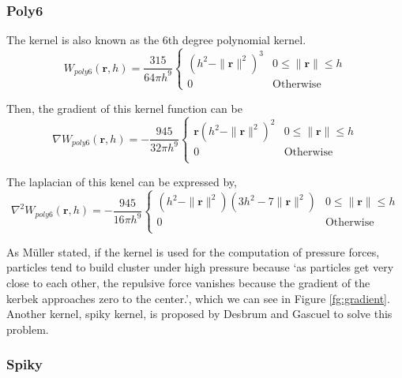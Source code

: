     \subsubsection{Poly6}
    \label{poly6}
    The kernel is also known as the 6th degree polynomial kernel.
    \begin{equation}
        W_{poly 6}(\textbf{r}, h) = \frac{315}{64\pi h^{9}}
            \begin{cases}
                (h^2 - \|\textbf{r}\|^2)^3 & 0 \le \|\textbf{r}\| \le h \\
                0 & \textrm{Otherwise}
            \end{cases}
    \end{equation}

    Then, the gradient of this kernel function can be
    \begin{equation}
        \nabla W_{poly 6}(\textbf{r}, h) = - \frac{945}{32\pi h^9}
            \begin{cases}
                \textbf{r}(h^2 - \|\textbf{r}\|^2)^2 & 0\le\|\textbf{r}\|\le h \\
                0 & \textrm{Otherwise}\\
            \end{cases}
    \end{equation}

    The laplacian of this kenel can be expressed by, 
    \begin{equation}
        \nabla^2 W_{poly6}(\textbf{r}, h) = - \frac{945}{16\pi h^9}
            \begin{cases}
                (h^2 - \|\textbf{r}\|^2)(3h^2-7\|\textbf{r}\|^2) & 0\le\|\textbf{r}\|\le h \\
                0 & \textrm{Otherwise}\\
            \end{cases}
    \end{equation}

    As M\"uller stated\cite{muller2003particle}, if the kernel is used for the computation of pressure forces, particles tend to build cluster under high pressure because `as particles get very close to each other, the repulsive force vanishes because the gradient of the kerbek approaches zero to the center.', which we can see in Figure \ref{fg:gradient}. Another kernel, spiky kernel, is proposed by Desbrum and Gascuel\cite{desbrun1996smoothed} to solve this problem.

    \subsubsection{Spiky}

